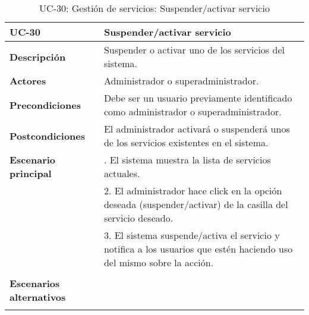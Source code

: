 \begin{table}[H]
  \begin{center}
    \begin{tabularx}{16.4cm}{|l|X|}
      \hline
      \textbf{UC-30} & \textbf{Suspender/activar servicio}\\
      \hline
      \textbf{Descripción} & Suspender o activar uno de los servicios del sistema.\\
      \hline
      \textbf{Actores} & Administrador o superadministrador.\\
      \hline
      \textbf{Precondiciones} & Debe ser un usuario previamente identificado como administrador o superadministrador.\\
      \hline
      \textbf{Postcondiciones} & El administrador activará o suspenderá unos de los servicios existentes en el sistema.\\
      \hline
      \textbf{Escenario principal} & \smallskip 1. El sistema muestra la lista de servicios actuales.\\
      & 2. El administrador hace click en la opción deseada (suspender/activar) de la casilla del servicio deseado.\\
      & 3. El sistema suspende/activa el servicio y notifica a los usuarios que estén haciendo uso del mismo sobre la acción.\\
      & \\
      \hline
      \textbf{Escenarios alternativos} & \smallskip \\
      & \\
      \hline
    \end{tabularx}
    \caption{UC-30: Gestión de servicios: Suspender/activar servicio}
  \end{center}
\end{table}


